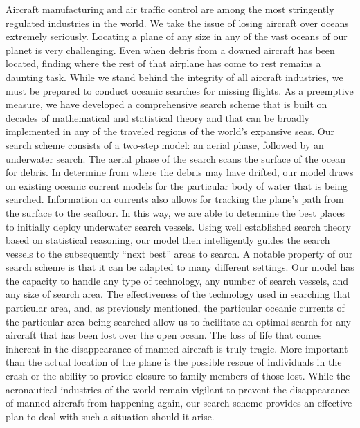 
Aircraft manufacturing and air traffic control are among the most stringently regulated industries in the world. We take the issue of losing aircraft over oceans extremely seriously. Locating a plane of any size in any of the vast oceans of our planet is very challenging. Even when debris from a downed aircraft has been located, finding where the rest of that airplane has come to rest remains a daunting task. While we stand behind the integrity of all aircraft industries, we must be prepared to conduct oceanic searches for missing flights. As a preemptive measure, we have developed a comprehensive search scheme that is built on decades of mathematical and statistical theory and that can be broadly implemented in any of the traveled regions of the world’s expansive seas.
Our search scheme consists of a two-step model: an aerial phase, followed by an underwater search. The aerial phase of the search scans the surface of the ocean for debris. In determine from where the debris may have drifted, our model draws on existing oceanic current models for the particular body of water that is being searched. Information on currents also allows for tracking the plane’s path from the surface to the seafloor. In this way, we are able to determine the best places to initially deploy underwater search vessels. Using well established search theory based on statistical reasoning, our model then intelligently guides the search vessels to the subsequently “next best” areas to search.
A notable property of our search scheme is that it can be adapted to many different settings. Our model has the capacity to handle any type of technology, any number of search vessels, and any size of search area. The effectiveness of the technology used in searching that particular area, and, as previously mentioned, the particular oceanic currents of the particular area being searched allow us to facilitate an optimal search for any aircraft that has been lost over the open ocean. 
	The loss of life that comes inherent in the disappearance of manned aircraft is truly tragic. More important than the actual location of the plane is the possible rescue of individuals in the crash or the ability to provide closure to family members of those lost. While the aeronautical industries of the world remain vigilant to prevent the disappearance of manned aircraft from happening again, our search scheme provides an effective plan to deal with such a situation should it arise.
